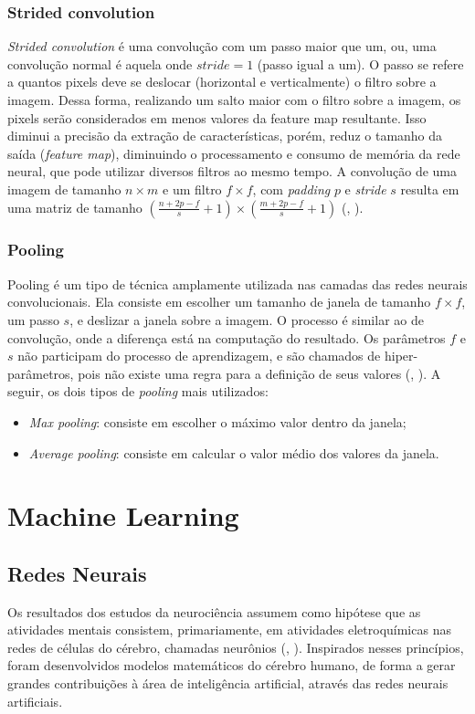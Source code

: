 \documentclass[]{politex}
\begin{document}
\subsubsection{Strided convolution}
\textit{Strided convolution} é uma convolução com um passo maior que um, ou, uma convolução normal é aquela onde \(stride=1\) (passo igual a um). O passo se refere a quantos pixels deve se deslocar (horizontal e verticalmente) o filtro sobre a imagem. Dessa forma, realizando um salto maior com o filtro sobre a imagem, os pixels serão considerados em menos valores da feature map resultante. Isso diminui a precisão da extração de características, porém, reduz o tamanho da saída (\textit{feature map}), diminuindo o processamento e consumo de memória da rede neural, que pode utilizar diversos filtros ao mesmo tempo. A convolução de uma imagem de tamanho \(n \times m\) e um filtro \(f \times f\), com \textit{padding} \(p\) e \textit{stride} \(s\) resulta em uma matriz de tamanho \((\frac{n+2p-f}{s}+1) \times (\frac{m+2p-f}{s}+1)\) (, \citeyear{cnncourse}).

\subsubsection{Pooling}
Pooling é um tipo de técnica amplamente utilizada nas camadas das redes neurais convolucionais. Ela consiste em escolher um tamanho de janela de tamanho \(f \times f\), um passo \(s\), e deslizar a janela sobre a imagem. O processo é similar ao de convolução, onde a diferença está na computação do resultado. Os parâmetros \(f\) e \(s\) não participam do processo de aprendizagem, e são chamados de hiper-parâmetros, pois não existe uma regra para a definição de seus valores (, \citeyear{cnncourse}). A seguir, os dois tipos de \textit{pooling} mais utilizados:
\begin{itemize}
\item \textit{Max pooling}: consiste em escolher o máximo valor dentro da janela;
\item \textit{Average pooling}: consiste em calcular o valor médio dos valores da janela.
\end{itemize}

\section{Machine Learning}
\subsection{Redes Neurais}
Os resultados dos estudos da neurociência assumem como hipótese que as atividades mentais consistem, primariamente, em atividades eletroquímicas nas redes de células do cérebro, chamadas neurônios (, \citeyear{Russell}). Inspirados nesses princípios, foram desenvolvidos modelos matemáticos do cérebro humano, de forma a gerar grandes contribuições à área de inteligência artificial, através das redes neurais artificiais.
\end{document}
